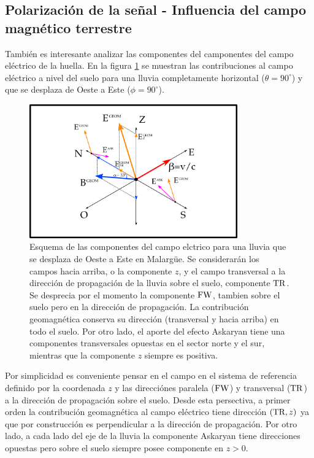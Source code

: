 	\subsection{Polarización de la señal - Influencia del campo magn\'etico terrestre}
	
	También es interesante analizar las componentes del camponentes del campo eléctrico de la huella.
	En la figura \ref{fig:malField} se muestran las contribuciones al campo eléctrico a nivel del suelo para una lluvia completamente horizontal ($\theta=90^\circ$) y que se desplaza de Oeste a Este ($\phi=90^\circ$).
	\begin{figure}[ht!]
		\centering
		\includegraphics[width=0.8\textwidth]{./fig/simulacionRadio/malField}
		\caption{\label{fig:malField}
		Esquema de las componentes del campo elctrico para una lluvia que se desplaza de Oeste a Este en Malargüe. Se considerarán los campos hacia arriba, o la componente $z$, y el campo transversal a la dirección de propagación de la lluvia sobre el suelo, componente ${\rm TR}$. Se desprecia por el momento la componente ${\rm FW}$, tambien sobre el suelo pero en la dirección de propagación. La contribución geomagnética conserva su dirección (transversal y hacia arriba) en todo el suelo. Por otro lado, el aporte del efecto Askaryan tiene una componentes transversales opuestas en el sector norte y el sur, mientras que la componente $z$ siempre es positiva.
		}
	\end{figure}
	Por simplicidad es conveniente pensar en el campo en el sistema de referencia definido por la coordenada $z$ y las direcciónes paralela (${\rm FW}$) y transversal (${\rm TR}$) a la dirección de propagación sobre el suelo.
	Desde esta persectiva, a primer orden la contribución geomagnética al campo eléctrico tiene dirección $({\rm TR},z)$ ya que por construcción es perpendicular a la dirección de propagación.
	Por otro lado, a cada lado del eje de la lluvia la componente Askaryan tiene direcciones opuestas pero sobre el suelo siempre posee componente en $z>0$.
	
